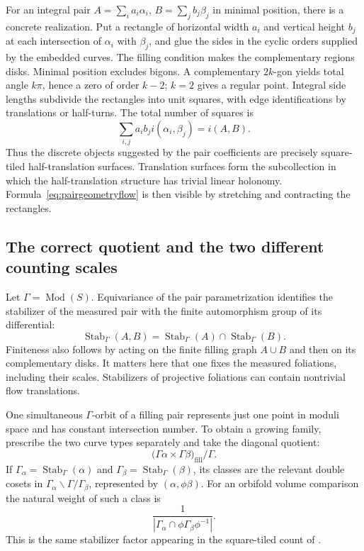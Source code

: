 \documentclass[11pt,a4paper]{article}
\numberwithin{equation}{section}
\theoremstyle{definition}
\theoremstyle{remark}
\begin{document}
For an integral pair
$A=\sum_i a_i\alpha_i$, $B=\sum_j b_j\beta_j$ in minimal position,
there is a concrete realization.  Put a rectangle of horizontal width
$a_i$ and vertical height $b_j$ at each intersection of $\alpha_i$
with $\beta_j$, and glue the sides in the cyclic orders supplied by
the embedded curves.  The filling condition makes the complementary
regions disks.  Minimal position excludes bigons.  A complementary
$2k$-gon yields total angle $k\pi$, hence a zero of order $k-2$;
$k=2$ gives a regular point.  Integral side lengths subdivide the
rectangles into unit squares, with edge identifications by translations
or half-turns.  The total number of squares is
\[
 \sum_{i,j}a_i b_j i(\alpha_i,\beta_j)=i(A,B).
\]
Thus the discrete objects suggested by the pair coefficients are
precisely square-tiled half-translation surfaces.  Translation surfaces
form the subcollection in which the half-translation structure has
trivial linear holonomy.  Formula~\eqref{eq:pairgeometryflow} is then
visible by stretching and contracting the rectangles.

\subsection{The correct quotient and the two different counting scales}
\label{subsec:pairquotient}

Let $\Gamma=\operatorname{Mod}(S)$.  Equivariance of the pair
parametrization identifies the stabilizer of the measured pair with
the finite automorphism group of its differential:
\[
 \operatorname{Stab}_\Gamma(A,B)
 =\operatorname{Stab}_\Gamma(A)\cap\operatorname{Stab}_\Gamma(B).
\]
Finiteness also follows by acting on the finite filling graph
$A\cup B$ and then on its complementary disks.  It matters here that
one fixes the measured foliations, including their scales.  Stabilizers
of projective foliations can contain nontrivial flow translations.

One simultaneous $\Gamma$-orbit of a filling pair represents just one
point in moduli space and has constant intersection number.  To obtain
a growing family, prescribe the two curve types separately and take
the diagonal quotient:
\[
 \bigl(\Gamma\alpha\times\Gamma\beta\bigr)_{\mathrm{fill}}/\Gamma.
\]
If $\Gamma_\alpha=\operatorname{Stab}_\Gamma(\alpha)$ and
$\Gamma_\beta=\operatorname{Stab}_\Gamma(\beta)$, its classes are the
relevant double cosets in
$\Gamma_\alpha\backslash\Gamma/\Gamma_\beta$, represented by
$(\alpha,\phi\beta)$.  For an orbifold volume comparison the natural
weight of such a class is
\[
 \frac{1}{|\Gamma_\alpha\cap
                \phi\Gamma_\beta\phi^{-1}|}.
\]
This is the same stabilizer factor appearing in the square-tiled
count of \cite[Section~1 and Section~3]{AranaHerreraSquare2020}.
\end{document}
